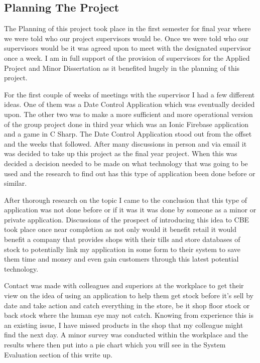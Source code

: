 \subsection{Planning The Project}
The Planning of this project took place in the first semester for final year where we were told who our project supervisors would be. Once we were told who our supervisors would be it was agreed upon to meet with the designated supervisor once a week. I am in full support of the provision of supervisors for the Applied Project and Minor Dissertation as it benefited hugely in the planning of this project. 
\newline

For the first couple of weeks of meetings with the supervisor I had a few different ideas. One of them was a Date Control Application which was eventually decided upon. The other two was to make a more sufficient and more operational version of the group project done  in third year which was an Ionic Firebase application and a game in C Sharp. The Date Control Application stood out from the offset and the weeks that followed. After many discussions in person and via email it was decided to take up this project as the final year project. When this was decided a decision needed to be made on what technology that was going to be used and the research to find out has this type of application been done before or similar. 
\newline

After thorough research on the topic I came to the conclusion that this type of application was not done before or if it was it was done by someone as a minor or private application. Discussions of the prospect of introducing this idea to CBE took place once near completion as not only would it benefit retail it would benefit a company that provides shops with their tills and store databases of stock to potentially link my application in some form to their system to save them time and money and even gain customers through this latest potential technology. 
\newline

Contact was made with colleagues and superiors at the workplace to get their view on the idea of using an application to help them get stock before it's sell by date and take action and catch everything in the store, be it shop floor stock or back stock where the human eye may not catch. Knowing from experience this is an existing issue, I have missed products in the shop that my colleague might find the next day. A minor survey was conducted within the workplace and the results where then put into a pie chart which you will see in the System Evaluation section of this write up. 
\newline

